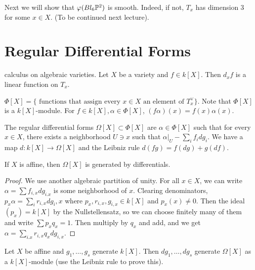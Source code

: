 \documentclass[twoside, 10pt]{article}
\begin{document}
        Next we will show that $\varphi(Bl_6 \P^2)$ is smooth. Indeed, if not,
        $T_x$ has dimension $3$ for some $x \in X$. (To be continued next
        lecture).

        \section{Regular Differential Forms}%
        calculus on algebraic varieties. Let $X$ be a variety and $f \in k[X]$.
        Then $d_xf$ is a linear function on $T_x$.

        \begin{defn} $\Phi[X] = \{ \text{ functions that assign every } x \in X
        \text{ an element of } T_x^{\vee} \}$. Note that $\Phi[X]$ is a
    $k[X]$-module. For $f \in k[X], \alpha \in \Phi[X]$, $(f \alpha)(x) = f(x)
\alpha(x)$.  \end{defn}

        \begin{defn} The regular differential forms $\Omega[X] \subset \Phi[X]$
            are $\alpha \in \Phi[X]$ such that for every $x \in X$, there
            exists a neighborhood $U \ni x$ such that $\alpha|_U - \sum_i f_i
            dg_i$. We have a map $d: k[X] \to \Omega[X]$ and the Leibniz rule
            $d(fg) = f(dg) + g(df)$.  \end{defn}

        \begin{lem} If $X$ is affine, then $\Omega[X]$ is generated by
            differentials.  \begin{proof} We use another algebraic partition of
                unity. For all $x \in X$, we can write $\alpha = \sum
                f_{i,x}dg_{i.x}$ is some neighborhood of $x$. Clearing
                denominators, $p_x \alpha = \sum_i r_{i,x} dg_i,x$ where
                $p_x,r_{i,x},g_{i,x} \in k[X]$ and $p_x(x) \neq 0$. Then the
                ideal $(p_x) = k[X]$ by the Nullstellensatz, so we can choose
                finitely many of them and write $\sum p_x q_x = 1$. Then
                multiply by $q_x$ and add, and we get $\alpha = \sum_{i.x}
            r_{i,x} q_x dg_{i,x}$.  \end{proof} \end{lem}

        \begin{cor} Let $X$ be affine and $g_1, \ldots, g_s$ generate $k[X]$.
        Then $dg_1, \ldots, dg_s$ generate $\Omega[X]$ as a $k[X]$-module (use
    the Leibniz rule to prove this).  \end{cor}
\end{document}
